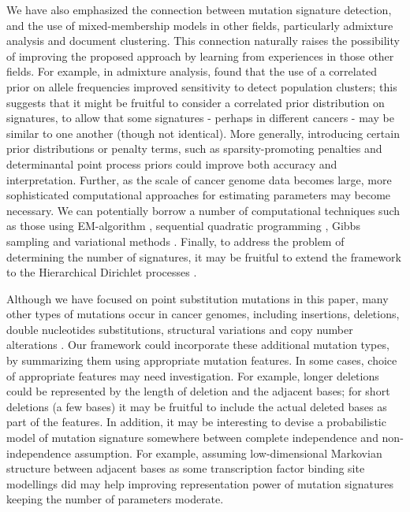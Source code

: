 \documentclass[10pt,letterpaper]{article}
\begin{document}
We have also emphasized the connection between mutation
signature detection, and the use of mixed-membership models
in other fields, particularly admixture analysis and document clustering.  This connection naturally raises the possibility of improving the proposed approach by learning from experiences in those other fields. For example, in admixture analysis, \cite{pmid12930761} found that the use of a correlated
prior on allele frequencies improved sensitivity to detect
population clusters; this suggests that it might be fruitful to consider a correlated prior distribution on signatures, to allow that some signatures - perhaps in different cancers - may be similar to one another (though not identical).
More generally, introducing certain prior distributions or penalty terms, such as sparsity-promoting penalties \cite{hoyer2004non, engelhardt2010analysis} and determinantal point process priors \cite{kulesza2012determinantal, kwok2012priors}
could improve both accuracy and interpretation.
Further, as the scale of cancer genome data becomes large,
more sophisticated computational approaches for estimating parameters may become necessary. We can potentially borrow a number of computational techniques such as those using EM-algorithm \cite{Hofmann:1999, tang2005estimation},
sequential quadratic programming \cite{zhou2011quasi}, Gibbs sampling \cite{pmid10835412,pmid14872004} 
and variational methods \cite{Blei:2003,teh2006collapsed,raj2014variational}.
Finally, to address the problem of determining the number of signatures, it may be fruitful to extend the framework to  
the Hierarchical Dirichlet processes \cite{teh2006hierarchical}.

Although we have focused on point substitution mutations in this paper, 
many other types of mutations occur in cancer genomes, 
including insertions, deletions, double nucleotides substitutions, structural variations and copy number alterations \cite{meyerson2010advances, helleday2014mechanisms}.
Our framework could incorporate these additional mutation types, by 
summarizing them using appropriate mutation features.
In some cases, choice of appropriate features may need investigation. 
For example, longer deletions could be represented by the length of deletion and the adjacent bases; 
for short deletions (a few bases) it may be fruitful to include the actual deleted bases as part of the features.
In addition, it may be interesting to devise a probabilistic model of mutation signature somewhere between complete independence and non-independence assumption.
For example, assuming low-dimensional Markovian structure between adjacent bases as some transcription factor binding site modellings did \cite{pmid16108724}
may help improving representation power of mutation signatures keeping the number of parameters moderate.
\end{document}
